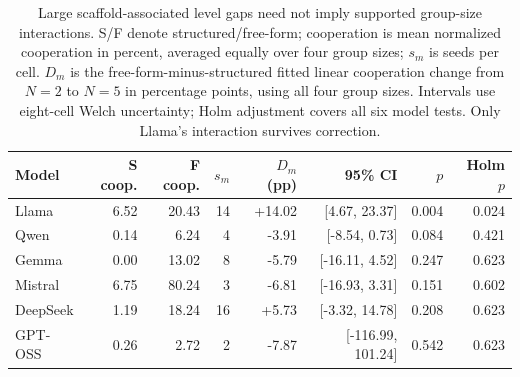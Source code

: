 \begin{table}[t]
\centering
\small
\setlength{\tabcolsep}{3pt}
\begin{tabular}{lrrrrrrr}
\toprule
Model & S coop. & F coop. & $s_m$ & $D_m$ (pp) & 95\% CI & $p$ & Holm $p$ \\
\midrule
Llama & 6.52 & 20.43 & 14 & +14.02 & [4.67, 23.37] & 0.004 & 0.024 \\
Qwen & 0.14 & 6.24 & 4 & -3.91 & [-8.54, 0.73] & 0.084 & 0.421 \\
Gemma & 0.00 & 13.02 & 8 & -5.79 & [-16.11, 4.52] & 0.247 & 0.623 \\
Mistral & 6.75 & 80.24 & 3 & -6.81 & [-16.93, 3.31] & 0.151 & 0.602 \\
DeepSeek & 1.19 & 18.24 & 16 & +5.73 & [-3.32, 14.78] & 0.208 & 0.623 \\
GPT-OSS & 0.26 & 2.72 & 2 & -7.87 & [-116.99, 101.24] & 0.542 & 0.623 \\
\bottomrule
\end{tabular}
\caption{Large scaffold-associated level gaps need not imply supported group-size interactions. S/F denote structured/free-form; cooperation is mean normalized cooperation in percent, averaged equally over four group sizes; $s_m$ is seeds per cell. $D_m$ is the free-form-minus-structured fitted linear cooperation change from $N=2$ to $N=5$ in percentage points, using all four group sizes. Intervals use eight-cell Welch uncertainty; Holm adjustment covers all six model tests. Only Llama's interaction survives correction.}
\label{tab:main-h4}
\end{table}
